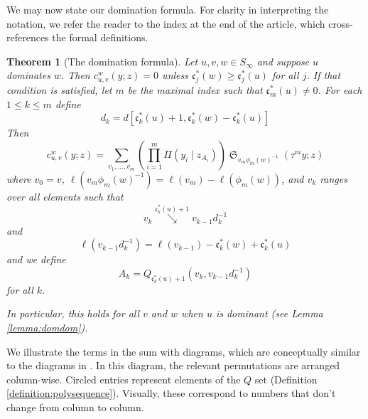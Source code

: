 \documentclass{amsart}
\newtheorem{theorem}{Theorem}[section]
\theoremstyle{definition}
\theoremstyle{remark}
\numberwithin{equation}{subsection}
\DeclareMathOperator{\sch}{\mathfrak{S}}
\newcommand{\smpfu}{\mathsf{\Pi}}
\newcommand{\smpre}[2]{\ensuremath{}\smpfu\left( #1 \mid #2\right)}
\newcommand{\downvar}[1]{\stackrel{#1}{\searrow}}
\newcommand{\shifthom}{\tau}
\newcommand{\shiftvby}[1]{\shifthom^{#1}}
\newcommand{\code}{\mathfrak{c}}
\begin{document}




 We may now state our domination formula. For clarity in interpreting the notation, we refer the reader to the index at the end of the article, which cross-references the formal definitions.

\begin{theorem}[The domination formula] \label{theorem:dualpieri}
Let $u,v,w\in S_\infty$ and suppose $u$ dominates $w$. Then $c_{u,v}^w(y;z)=0$ unless $\code_j^*(w)\geq \code_j^*(u)$ for all $j$. If that condition is satisfied, let $m$ be the maximal index such that $\code_m^*(u)\neq 0$. For each $1\leq k\leq m$ define
$$d_k=d[\code_k^*(u)+1,\code^*_k(w)-\code_k^*(u)]$$
Then
$$c_{u,v}^w(y;z)=\sum_{v_1,\ldots,v_m} \left(\prod_{i=1}^m\smpre{y_i}{z_{A_i}}\right)\sch_{v_m\phi_m(w)^{-1}}(\shiftvby{m}y;z)$$
where $v_0=v$, $\ell(v_m\phi_m(w)^{-1})=\ell(v_m)-\ell(\phi_m(w))$, and $v_k$ ranges over all elements such that 
$$v_k\downvar{\code_k^*(u)+1}v_{k-1}d_k^{-1}$$
and
$$\ell(v_{k-1}d_k^{-1})=\ell(v_{k-1})-\code_k^*(w)+\code_k^*(u)$$
and we define
$$A_k = Q_{\code_k^*(u)+1}(v_k,v_{k-1}d_k^{-1})$$
for all $k$.

In particular, this holds for all $v$ and $w$ when $u$ is dominant (see Lemma \ref{lemma:domdom}).
\end{theorem}

We illustrate the terms in the sum with diagrams, which are conceptually similar to the diagrams in \cite{samuelmolev}. In this diagram, the relevant permutations are arranged column-wise. Circled entries represent elements of the $Q$ set (Definition \ref{definition:polysequence}). Visually, these correspond to numbers that don't change from column to column. 
\end{document}
